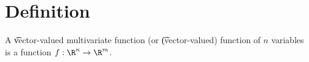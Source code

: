 
\section*{Definition}

A \t{vector-valued multivariate function} (or \t{(vector-valued) function of $n$ variables} is a function $f: \R ^n \to \R ^m$.

\blankpage
